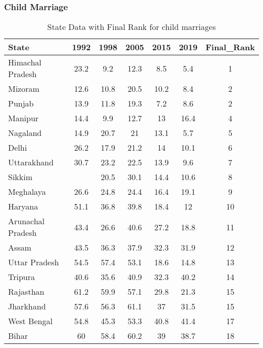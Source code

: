 \subsubsection{Child Marriage}
\begin{table}[h!]
\centering
\begin{tabular}{lcccccc}
\toprule
State             & 1992 & 1998 & 2005 & 2015 & 2019 & Final\_Rank \\
\midrule
Himachal Pradesh  & 23.2 & 9.2  & 12.3 & 8.5  & 5.4  & 1          \\
Mizoram           & 12.6 & 10.8 & 20.5 & 10.2 & 8.4  & 2          \\
Punjab            & 13.9 & 11.8 & 19.3 & 7.2  & 8.6  & 2          \\
Manipur           & 14.4 & 9.9  & 12.7 & 13   & 16.4 & 4          \\
Nagaland          & 14.9 & 20.7 & 21   & 13.1 & 5.7  & 5          \\
Delhi             & 26.2 & 17.9 & 21.2 & 14   & 10.1 & 6          \\
Uttarakhand       & 30.7 & 23.2 & 22.5 & 13.9 & 9.6  & 7          \\
Sikkim            &      & 20.5 & 30.1 & 14.4 & 10.6 & 8          \\
Meghalaya         & 26.6 & 24.8 & 24.4 & 16.4 & 19.1 & 9          \\
Haryana           & 51.1 & 36.8 & 39.8 & 18.4 & 12   & 10         \\
Arunachal Pradesh & 43.4 & 26.6 & 40.6 & 27.2 & 18.8 & 11         \\
Assam             & 43.5 & 36.3 & 37.9 & 32.3 & 31.9 & 12         \\
Uttar Pradesh     & 54.5 & 57.4 & 53.1 & 18.6 & 14.8 & 13         \\
Tripura           & 40.6 & 35.6 & 40.9 & 32.3 & 40.2 & 14         \\
Rajasthan         & 61.2 & 59.9 & 57.1 & 29.8 & 21.3 & 15         \\
Jharkhand         & 57.6 & 56.3 & 61.1 & 37   & 31.5 & 15         \\
West Bengal       & 54.8 & 45.3 & 53.3 & 40.8 & 41.4 & 17         \\
Bihar             & 60   & 58.4 & 60.2 & 39   & 38.7 & 18         \\
\bottomrule
\end{tabular}
\caption{State Data with Final Rank for child marriages}
\label{tab:child_marriage}
\end{table}

